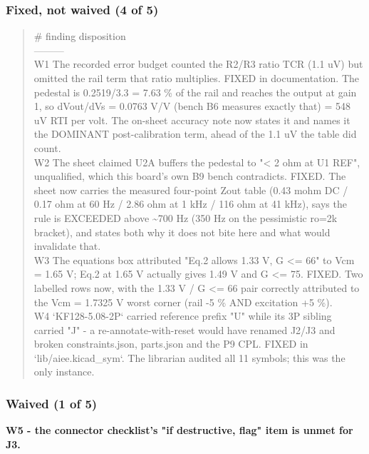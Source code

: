 \documentclass[11pt,a4paper]{article}
\begin{document}
\subsubsection*{Fixed, not waived (4 of 5)}
\begin{quote}\small\ttfamily\raggedright
\textbar{} \# \textbar{} finding \textbar{} disposition \textbar{}\\
\textbar{}---\textbar{}---\textbar{}---\textbar{}\\
\textbar{} W1 \textbar{} The recorded error budget counted the R2/R3 ratio TCR (1.1 uV) but omitted the rail term that ratio multiplies. \textbar{} FIXED in documentation. The pedestal is 0.2519/3.3 = 7.63 \% of the rail and reaches the output at gain 1, so dVout/dVs = 0.0763 V/V (bench B6 measures exactly that) = 548 uV RTI per volt. The on-sheet accuracy note now states it and names it the DOMINANT post-calibration term, ahead of the 1.1 uV the table did count. \textbar{}\\
\textbar{} W2 \textbar{} The sheet claimed U2A buffers the pedestal to "\textless{} 2 ohm at U1 REF", unqualified, which this board's own B9 bench contradicts. \textbar{} FIXED. The sheet now carries the measured four-point Zout table (0.43 mohm DC / 0.17 ohm at 60 Hz / 2.86 ohm at 1 kHz / 116 ohm at 41 kHz), says the rule is EXCEEDED above \textasciitilde{}700 Hz (350 Hz on the pessimistic ro=2k bracket), and states both why it does not bite here and what would invalidate that. \textbar{}\\
\textbar{} W3 \textbar{} The equations box attributed "Eq.2 allows 1.33 V, G \textless{}= 66" to Vcm = 1.65 V; Eq.2 at 1.65 V actually gives 1.49 V and G \textless{}= 75. \textbar{} FIXED. Two labelled rows now, with the 1.33 V / G \textless{}= 66 pair correctly attributed to the Vcm = 1.7325 V worst corner (rail -5 \% AND excitation +5 \%). \textbar{}\\
\textbar{} W4 \textbar{} `KF128-5.08-2P` carried reference prefix "U" while its 3P sibling carried "J" - a re-annotate-with-reset would have renamed J2/J3 and broken constraints.json, parts.json and the P9 CPL. \textbar{} FIXED in `lib/aiee.kicad\_sym`. The librarian audited all 11 symbols; this was the only instance. \textbar{}
\end{quote}
\subsubsection*{Waived (1 of 5)}
\textbf{W5 - the connector checklist's "if destructive, flag" item is unmet for J3.}
\end{document}
